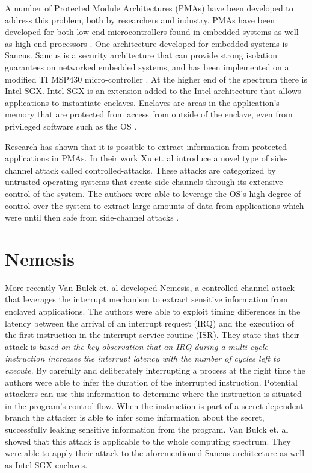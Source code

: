 A number of Protected Module Architectures (PMAs) have been developed to address this problem, both by researchers and industry. 
PMAs have been developed for both low-end microcontrollers found in embedded systems \cite{trustlite, smart} as well as high-end processors \cite{isox}.
One architecture developed for embedded systems is Sancus. Sancus is a security architecture that can provide strong isolation guarantees on networked embedded systems, 
and has been implemented on a modified TI MSP430 micro-controller \cite{sancus}. 
At the higher end of the spectrum there is Intel SGX. 
Intel SGX is an extension  added to the Intel architecture that allows applications to instantiate enclaves. 
Enclaves are areas in the application's memory that are protected from access from outside of the enclave, even from 
privileged software such as the OS \cite{SGX}. 

Research has shown that it is possible to extract information from protected applications in PMAs. In their work Xu et. al introduce a novel type of side-channel attack 
called controlled-attacks. These attacks are categorized by untrusted operating systems that create side-channels through its extensive control of the system.
The authors were able to leverage the OS's high degree of control over the system to extract large amounts of data from applications which were until 
then safe from side-channel attacks \cite{xu}. 

\section{Nemesis}
More recently Van Bulck et. al \cite{Nemesis} developed Nemesis, a controlled-channel attack that leverages the interrupt mechanism to extract sensitive information from 
enclaved applications. The authors were able to exploit timing differences in the latency between the arrival of an interrupt request (IRQ) and the execution of the first instruction in the 
interrupt service routine (ISR). They state that their attack is \textit{based on the key observation that an IRQ during a multi-cycle instruction increases the interrupt 
latency with the number of cycles left to execute}. By carefully and deliberately interrupting a process at the right time the authors were able to infer the duration of the interrupted instruction. 
Potential attackers can use this information to determine where the instruction is situated in the program's control flow. When the instruction is part of a secret-dependent branch the 
attacker is able to infer some information about the secret, successfully leaking sensitive information from the program. Van Bulck et. al \cite{Nemesis} showed that this attack is applicable to 
the whole computing spectrum. They were able to apply their attack to the aforementioned Sancus architecture as well as Intel SGX enclaves.  

